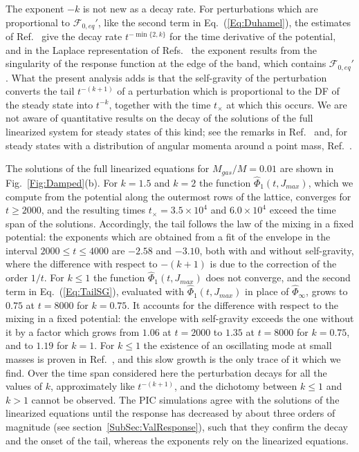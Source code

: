 The exponent $-k$ is not new as a decay rate. For perturbations which are proportional to $\mathcal{F}_{0,eq}'$, like the second term in Eq.~(\ref{Eq:Duhamel}), the estimates of Ref.~\cite{mHgRmScS24} give the decay rate $t^{-\min\{ 2,k \}}$ for the time derivative of the potential, and in the Laplace representation of Refs.~\cite{jBaOyY11,jByY13} the exponent results from the singularity of the response function at the edge of the band, which contains $\mathcal{F}_{0,eq}'$. What the present analysis adds is that the self-gravity of the perturbation converts the tail $t^{-(k+1)}$ of a perturbation which is proportional to the DF of the steady state into $t^{-k}$, together with the time $t_\times$ at which this occurs. We are not aware of quantitative results on the decay of the solutions of the full linearized system for steady states of this kind; see the remarks in Ref.~\cite{cS24} and, for steady states with a distribution of angular momenta around a point mass, Ref.~\cite{mHmS25}. 

The solutions of the full linearized equations for $M_{gas}/M = 0.01$ are shown in Fig.~\ref{Fig:Damped}(b). For $k = 1.5$ and $k = 2$ the function $\hat{\Phi}_1(t,J_{max})$, which we compute from the potential along the outermost rows of the lattice, converges for $t\geq 2000$, and the resulting times $t_\times = 3.5\times 10^4$ and $6.0\times 10^4$ exceed the time span of the solutions. Accordingly, the tail follows the law of the mixing in a fixed potential: the exponents which are obtained from a fit of the envelope in the interval $2000\leq t\leq 4000$ are $-2.58$ and $-3.10$, both with and without self-gravity, where the difference with respect to $-(k+1)$ is due to the correction of the order $1/t$. For $k\leq 1$ the function $\hat{\Phi}_1(t,J_{max})$ does not converge, and the second term in Eq.~(\ref{Eq:TailSG}), evaluated with $\hat{\Phi}_1(t,J_{max})$ in place of $\hat{\Phi}_\infty$, grows to $0.75$ at $t = 8000$ for $k = 0.75$. It accounts for the difference with respect to the mixing in a fixed potential: the envelope with self-gravity exceeds the one without it by a factor which grows from $1.06$ at $t = 2000$ to $1.35$ at $t = 8000$ for $k = 0.75$, and to $1.19$ for $k = 1$. For $k\leq 1$ the existence of an oscillating mode at small masses is proven in Ref.~\cite{mHgRmScS25}, and this slow growth is the only trace of it which we find. Over the time span considered here the perturbation decays for all the values of $k$, approximately like $t^{-(k+1)}$, and the dichotomy between $k\leq 1$ and $k > 1$ cannot be observed. The PIC simulations agree with the solutions of the linearized equations until the response has decreased by about three orders of magnitude (see section~\ref{SubSec:ValResponse}), such that they confirm the decay and the onset of the tail, whereas the exponents rely on the linearized equations.

